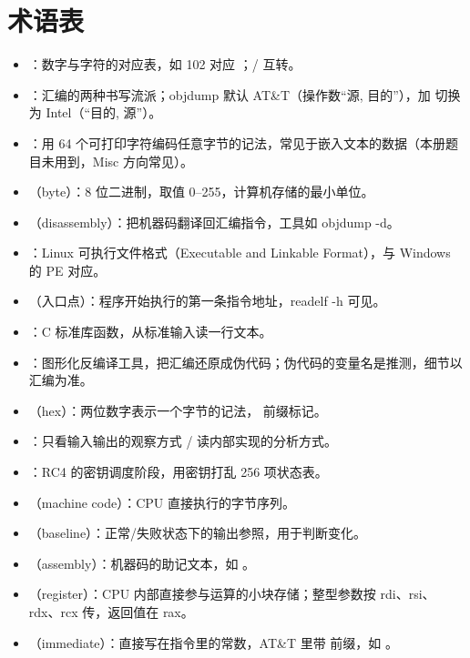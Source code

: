 \documentclass[UTF8,12pt,oneside]{ctexbook}
\begin{document}
\chapter{术语表}

\begin{itemize}
\item {}：数字与字符的对应表，如 102 对应 ；/ 互转。
\item {}：汇编的两种书写流派；objdump 默认 AT\&T（操作数“源, 目的”），加  切换为 Intel（“目的, 源”）。
\item {}：用 64 个可打印字符编码任意字节的记法，常见于嵌入文本的数据（本册题目未用到，Misc 方向常见）。
\item {}（byte）：8 位二进制，取值 0--255，计算机存储的最小单位。
\item {}（disassembly）：把机器码翻译回汇编指令，工具如 objdump -d。
\item {}：Linux 可执行文件格式（Executable and Linkable Format），与 Windows 的 PE 对应。
\item {}（入口点）：程序开始执行的第一条指令地址，readelf -h 可见。
\item {}：C 标准库函数，从标准输入读一行文本。
\item {}：图形化反编译工具，把汇编还原成伪代码；伪代码的变量名是推测，细节以汇编为准。
\item {}（hex）：两位数字表示一个字节的记法， 前缀标记。
\item {}：只看输入输出的观察方式 / 读内部实现的分析方式。
\item {}：RC4 的密钥调度阶段，用密钥打乱 256 项状态表。
\item {}（machine code）：CPU 直接执行的字节序列。
\item {}（baseline）：正常/失败状态下的输出参照，用于判断变化。
\item {}（assembly）：机器码的助记文本，如 。
\item {}（register）：CPU 内部直接参与运算的小块存储；整型参数按 rdi、rsi、rdx、rcx 传，返回值在 rax。
\item {}（immediate）：直接写在指令里的常数，AT\&T 里带 \code{\$} 前缀，如 。

\end{itemize}
\end{document}
